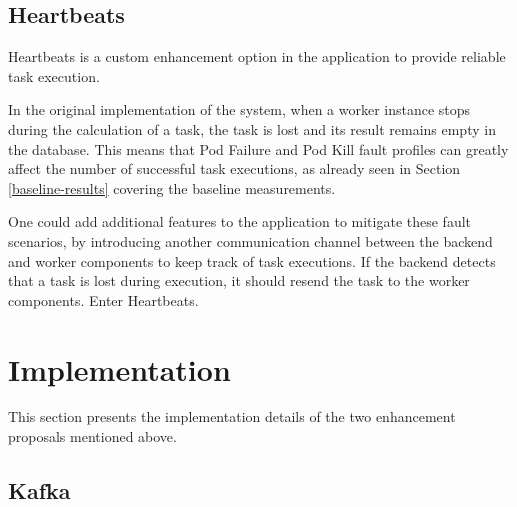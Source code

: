 \subsection{Heartbeats}

Heartbeats is a custom enhancement option in the application to provide reliable task execution.

In the original implementation of the system, when a worker instance stops during the calculation of a task, the task is lost and its result remains empty in the database. This means that Pod Failure and Pod Kill fault profiles can greatly affect the number of successful task executions, as already seen in Section \ref{baseline-results} covering the baseline measurements.

One could add additional features to the application to mitigate these fault scenarios, by introducing another communication channel between the backend and worker components to keep track of task executions. If the backend detects that a task is lost during execution, it should resend the task to the worker components. Enter Heartbeats.

\section{Implementation}

This section presents the implementation details of the two enhancement proposals mentioned above.

\subsection{Kafka}


